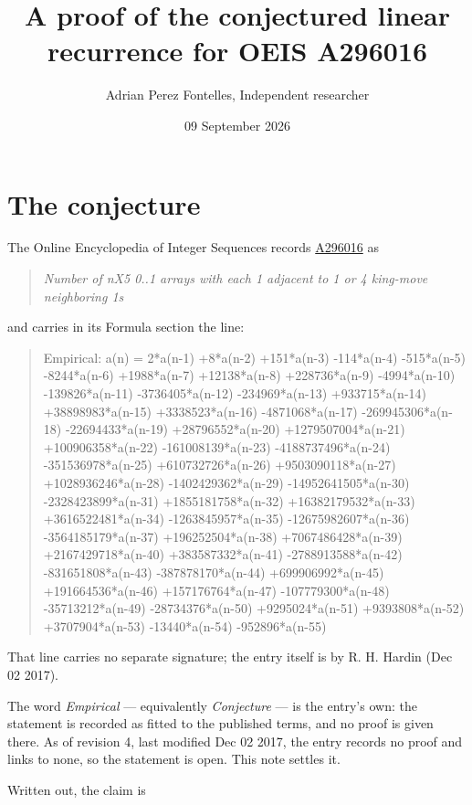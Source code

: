 \documentclass[11pt]{article}
\title{A proof of the conjectured linear recurrence for OEIS A296016}
\author{Adrian Perez Fontelles, Independent researcher}
\date{09 September 2026}
\theoremstyle{definition}
\begin{document}
\maketitle
\section{The conjecture}

The Online Encyclopedia of Integer Sequences records \href{https://oeis.org/A296016}{A296016} as

\begin{quote}\itshape Number of nX5 0..1 arrays with each 1 adjacent to 1 or 4 king-move neighboring 1s\end{quote}

and carries in its Formula section the line:

\begin{quote}\ttfamily Empirical: a(n) = 2*a(n-1) +8*a(n-2) +151*a(n-3) -114*a(n-4) -515*a(n-5) -8244*a(n-6) +1988*a(n-7) +12138*a(n-8) +228736*a(n-9) -4994*a(n-10) -139826*a(n-11) -3736405*a(n-12) -234969*a(n-13) +933715*a(n-14) +38898983*a(n-15) +3338523*a(n-16) -4871068*a(n-17) -269945306*a(n-18) -22694433*a(n-19) +28796552*a(n-20) +1279507004*a(n-21) +100906358*a(n-22) -161008139*a(n-23) -4188737496*a(n-24) -351536978*a(n-25) +610732726*a(n-26) +9503090118*a(n-27) +1028936246*a(n-28) -1402429362*a(n-29) -14952641505*a(n-30) -2328423899*a(n-31) +1855181758*a(n-32) +16382179532*a(n-33) +3616522481*a(n-34) -1263845957*a(n-35) -12675982607*a(n-36) -3564185179*a(n-37) +196252504*a(n-38) +7067486428*a(n-39) +2167429718*a(n-40) +383587332*a(n-41) -2788913588*a(n-42) -831651808*a(n-43) -387878170*a(n-44) +699906992*a(n-45) +191664536*a(n-46) +157176764*a(n-47) -107779300*a(n-48) -35713212*a(n-49) -28734376*a(n-50) +9295024*a(n-51) +9393808*a(n-52) +3707904*a(n-53) -13440*a(n-54) -952896*a(n-55)\end{quote}

That line carries no separate signature; the entry itself is by R. H. Hardin (Dec 02 2017).

The word {\itshape Empirical} --- equivalently {\itshape Conjecture} --- is the entry's own: the statement is recorded as fitted to the published terms, and no proof is given there. As of revision 4, last modified Dec 02 2017, the entry records no proof and links to none, so the statement is open. This note settles it.

Written out, the claim is
\end{document}
